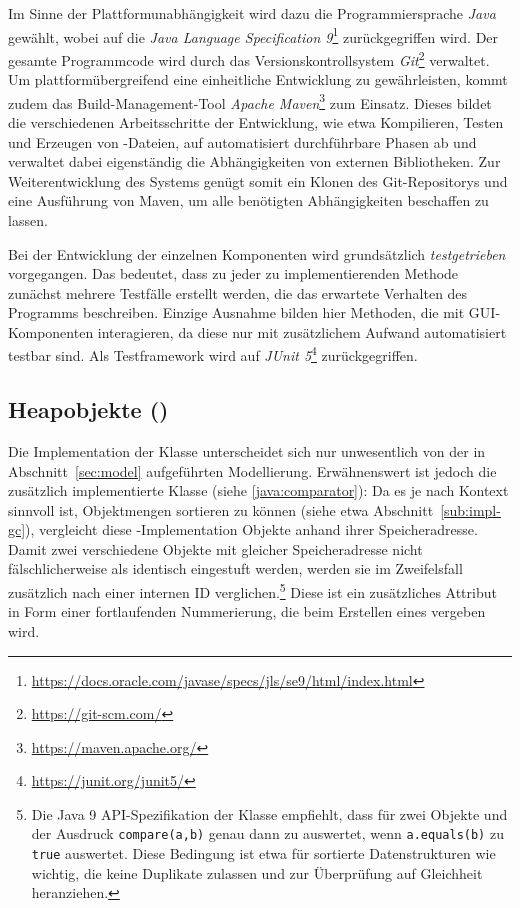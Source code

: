 Im Sinne der Plattformunabhängigkeit wird dazu die Programmiersprache \textit{Java} gewählt, wobei auf die \textit{Java Language Specification 9}\footnote{\url{https://docs.oracle.com/javase/specs/jls/se9/html/index.html}} zurückgegriffen wird.
Der gesamte Programmcode wird durch das Versionskontrollsystem \textit{Git}\footnote{\url{https://git-scm.com/}} verwaltet.
Um plattformübergreifend eine einheitliche Entwicklung zu gewährleisten, kommt zudem das Build-Management-Tool \textit{Apache Maven}\footnote{\url{https://maven.apache.org/}} zum Einsatz.
Dieses bildet die verschiedenen Arbeitsschritte der Entwicklung, wie etwa Kompilieren, Testen und Erzeugen von -Dateien, auf automatisiert durchführbare Phasen ab und verwaltet dabei eigenständig die Abhängigkeiten von externen Bibliotheken.
Zur Weiterentwicklung des Systems genügt somit ein Klonen des Git-Repositorys und eine Ausführung von Maven, um alle benötigten Abhängigkeiten beschaffen zu lassen.

Bei der Entwicklung der einzelnen Komponenten wird grundsätzlich \textit{testgetrieben} vorgegangen.
Das bedeutet, dass zu jeder zu implementierenden Methode zunächst mehrere Testfälle erstellt werden, die das erwartete Verhalten des Programms beschreiben.
Einzige Ausnahme bilden hier Methoden, die mit GUI-Komponenten interagieren, da diese nur mit zusätzlichem Aufwand automatisiert testbar sind.
Als Testframework wird auf \textit{JUnit 5}\footnote{\url{https://junit.org/junit5/}} zurückgegriffen.

\subsection{Heapobjekte ()}
\label{sub:heapobject}
Die Implementation der Klasse  unterscheidet sich nur unwesentlich von der in Abschnitt~\ref{sec:model} aufgeführten Modellierung.
Erwähnenswert ist jedoch die zusätzlich implementierte Klasse  (siehe \ref{java:comparator}):
Da es je nach Kontext sinnvoll ist, Objektmengen sortieren zu können (siehe etwa Abschnitt~\ref{sub:impl-gc}), vergleicht diese -Implementation Objekte anhand ihrer Speicheradresse.
Damit zwei verschiedene Objekte mit gleicher Speicheradresse nicht fälschlicherweise als identisch eingestuft werden, werden sie im Zweifelsfall zusätzlich nach einer internen ID verglichen.\footnote{Die Java 9 API-Spezifikation der Klasse  empfiehlt, dass für zwei Objekte  und  der Ausdruck \texttt{compare(a,b)} genau dann zu  auswertet, wenn \texttt{a.equals(b)} zu \texttt{true} auswertet. Diese Bedingung ist etwa für sortierte Datenstrukturen wie  wichtig, die keine Duplikate zulassen und  zur Überprüfung auf Gleichheit heranziehen.}
Diese ist ein zusätzliches Attribut in Form einer fortlaufenden Nummerierung, die beim Erstellen eines  vergeben wird.


